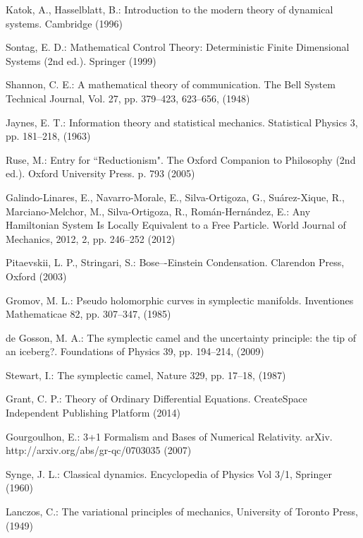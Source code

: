 \documentclass[smallextended]{svjour3}
\numberwithin{equation}{section}
\theoremstyle{definition}
\begin{document}
\begin{thebibliography}{0}
 Katok, A., Hasselblatt, B.: Introduction to the modern theory of dynamical systems. Cambridge (1996)

 Sontag, E. D.: Mathematical Control Theory: Deterministic Finite Dimensional Systems (2nd ed.). Springer (1999)

 Shannon, C. E.: A mathematical theory of communication. The Bell System Technical Journal, Vol. 27, pp. 379--423, 623--656, (1948)

 Jaynes, E. T.: Information theory and statistical mechanics. Statistical Physics 3, pp. 181--218, (1963)

 Ruse, M.: Entry for ``Reductionism". The Oxford Companion to Philosophy (2nd ed.). Oxford University Press. p. 793 (2005)

 Galindo-Linares, E., Navarro-Morale, E., Silva-Ortigoza, G., Suárez-Xique, R., Marciano-Melchor, M., Silva-Ortigoza, R., Román-Hernández, E.: Any Hamiltonian System Is Locally Equivalent to a Free Particle. World Journal of Mechanics, 2012, 2, pp. 246--252 (2012) 

 Pitaevskii, L. P., Stringari, S.: Bose–-Einstein Condensation. Clarendon Press, Oxford (2003)

 Gromov, M. L.: Pseudo holomorphic curves in symplectic manifolds. Inventiones Mathematicae 82, pp. 307--347, (1985)

 de Gosson, M. A.: The symplectic camel and the uncertainty principle: the tip of an iceberg?. Foundations of Physics 39, pp. 194--214, (2009)

 Stewart, I.: The symplectic camel, Nature 329, pp. 17--18, (1987)

 Grant, C. P.: Theory of Ordinary Differential Equations. CreateSpace Independent Publishing Platform (2014)


 Gourgoulhon, E.: 3+1 Formalism and Bases of Numerical Relativity. arXiv. http://arxiv.org/abs/gr-qc/0703035 (2007)

 Synge, J. L.: Classical dynamics. Encyclopedia of Physics Vol 3/1, Springer (1960)

 Lanczos, C.: The variational principles of mechanics, University of Toronto Press, (1949)


\end{thebibliography}
\end{document}
